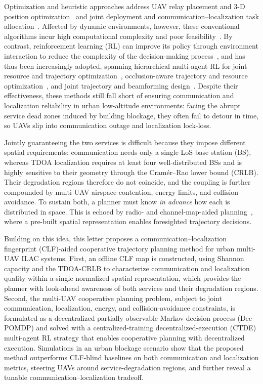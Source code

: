 \documentclass[lettersize,journal]{IEEEtran}
\begin{document}
Optimization and heuristic approaches address UAV relay placement and 3-D position optimization~\cite{ref7} and joint deployment and communication--localization task allocation~\cite{ref8}. Affected by dynamic environments, however, these conventional algorithms incur high computational complexity and poor feasibility~\cite{ref9}. By contrast, reinforcement learning (RL) can improve its policy through environment interaction to reduce the complexity of the decision-making process~\cite{ref10}, and has thus been increasingly adopted, spanning hierarchical multi-agent RL for joint resource and trajectory optimization~\cite{ref9}, occlusion-aware trajectory and resource optimization~\cite{ref11}, and joint trajectory and beamforming design~\cite{ref12}. Despite their effectiveness, these methods still fall short of ensuring communication and localization reliability in urban low-altitude environments: facing the abrupt service dead zones induced by building blockage, they often fail to detour in time, so UAVs slip into communication outage and localization lock-loss.

Jointly guaranteeing the two services is difficult because they impose different spatial requirements: communication needs only a single LoS base station (BS), whereas TDOA localization requires at least four well-distributed BSs and is highly sensitive to their geometry through the Cram\'er--Rao lower bound (CRLB). Their degradation regions therefore do not coincide, and the coupling is further compounded by multi-UAV airspace contention, energy limits, and collision avoidance. To sustain both, a planner must know \emph{in advance} how each is distributed in space. This is echoed by radio- and channel-map-aided planning~\cite{ref13,ref14,ref15}, where a pre-built spatial representation enables foresighted trajectory decisions.

Building on this idea, this letter proposes a communication--localization fingerprint (CLF)-aided cooperative trajectory planning method for urban multi-UAV ILAC systems. First, an offline CLF map is constructed, using Shannon capacity and the TDOA-CRLB to characterize communication and localization quality within a single normalized spatial representation, which provides the planner with look-ahead awareness of both services and their degradation regions. Second, the multi-UAV cooperative planning problem, subject to joint communication, localization, energy, and collision-avoidance constraints, is formulated as a decentralized partially observable Markov decision process (Dec-POMDP) and solved with a centralized-training decentralized-execution (CTDE) multi-agent RL strategy that enables cooperative planning with decentralized execution. Simulations in an urban blockage scenario show that the proposed method outperforms CLF-blind baselines on both communication and localization metrics, steering UAVs around service-degradation regions, and further reveal a tunable communication--localization tradeoff.
\end{document}
